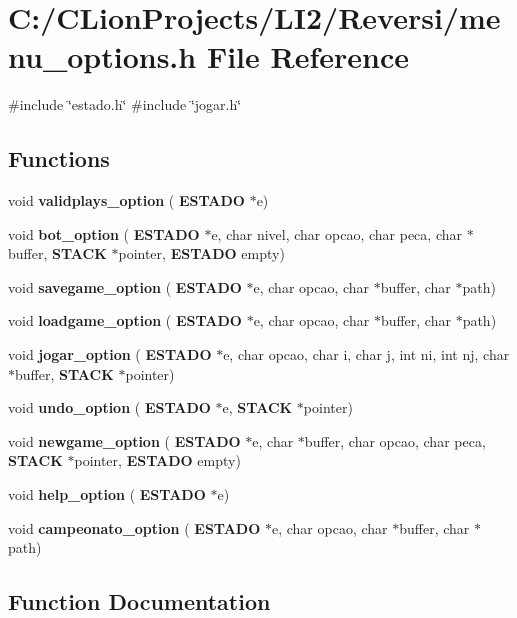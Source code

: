 \section{C\+:/\+C\+Lion\+Projects/\+L\+I2/\+Reversi/menu\+\_\+options.h File Reference}
\label{menu__options_8h}
{\ttfamily \#include \char`\"{}estado.\+h\char`\"{}}\newline
{\ttfamily \#include \char`\"{}jogar.\+h\char`\"{}}\newline
\subsection*{Functions}
\begin{DoxyCompactItemize}
\item 
void \textbf{ validplays\+\_\+option} (\textbf{ E\+S\+T\+A\+DO} $\ast$e)
\item 
void \textbf{ bot\+\_\+option} (\textbf{ E\+S\+T\+A\+DO} $\ast$e, char nivel, char opcao, char peca, char $\ast$buffer, \textbf{ S\+T\+A\+CK} $\ast$pointer, \textbf{ E\+S\+T\+A\+DO} empty)
\item 
void \textbf{ savegame\+\_\+option} (\textbf{ E\+S\+T\+A\+DO} $\ast$e, char opcao, char $\ast$buffer, char $\ast$path)
\item 
void \textbf{ loadgame\+\_\+option} (\textbf{ E\+S\+T\+A\+DO} $\ast$e, char opcao, char $\ast$buffer, char $\ast$path)
\item 
void \textbf{ jogar\+\_\+option} (\textbf{ E\+S\+T\+A\+DO} $\ast$e, char opcao, char i, char j, int ni, int nj, char $\ast$buffer, \textbf{ S\+T\+A\+CK} $\ast$pointer)
\item 
void \textbf{ undo\+\_\+option} (\textbf{ E\+S\+T\+A\+DO} $\ast$e, \textbf{ S\+T\+A\+CK} $\ast$pointer)
\item 
void \textbf{ newgame\+\_\+option} (\textbf{ E\+S\+T\+A\+DO} $\ast$e, char $\ast$buffer, char opcao, char peca, \textbf{ S\+T\+A\+CK} $\ast$pointer, \textbf{ E\+S\+T\+A\+DO} empty)
\item 
void \textbf{ help\+\_\+option} (\textbf{ E\+S\+T\+A\+DO} $\ast$e)
\item 
void \textbf{ campeonato\+\_\+option} (\textbf{ E\+S\+T\+A\+DO} $\ast$e, char opcao, char $\ast$buffer, char $\ast$path)
\end{DoxyCompactItemize}


\subsection{Function Documentation}
\mbox{\label{menu__options_8h_a0ef7d600ed82dba4317d00eba6bf28b7}} 
